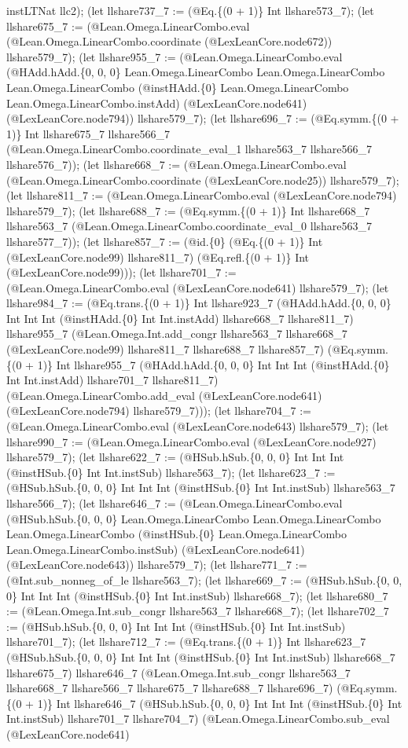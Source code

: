 \documentclass[11pt]{article}
\begin{document}
instLTNat llc2); (let llshare737\_7 := (@Eq.\{(0 + 1)\} Int llshare573\_7); (let llshare675\_7 := (@Lean.Omega.LinearCombo.eval (@Lean.Omega.LinearCombo.coordinate (@LexLeanCore.node672)) llshare579\_7); (let llshare955\_7 := (@Lean.Omega.LinearCombo.eval (@HAdd.hAdd.\{0, 0, 0\} Lean.Omega.LinearCombo Lean.Omega.LinearCombo Lean.Omega.LinearCombo (@instHAdd.\{0\} Lean.Omega.LinearCombo Lean.Omega.LinearCombo.instAdd) (@LexLeanCore.node641) (@LexLeanCore.node794)) llshare579\_7); (let llshare696\_7 := (@Eq.symm.\{(0 + 1)\} Int llshare675\_7 llshare566\_7 (@Lean.Omega.LinearCombo.coordinate\_eval\_1 llshare563\_7 llshare566\_7 llshare576\_7)); (let llshare668\_7 := (@Lean.Omega.LinearCombo.eval (@Lean.Omega.LinearCombo.coordinate (@LexLeanCore.node25)) llshare579\_7); (let llshare811\_7 := (@Lean.Omega.LinearCombo.eval (@LexLeanCore.node794) llshare579\_7); (let llshare688\_7 := (@Eq.symm.\{(0 + 1)\} Int llshare668\_7 llshare563\_7 (@Lean.Omega.LinearCombo.coordinate\_eval\_0 llshare563\_7 llshare577\_7)); (let llshare857\_7 := (@id.\{0\} (@Eq.\{(0 + 1)\} Int (@LexLeanCore.node99) llshare811\_7) (@Eq.refl.\{(0 + 1)\} Int (@LexLeanCore.node99))); (let llshare701\_7 := (@Lean.Omega.LinearCombo.eval (@LexLeanCore.node641) llshare579\_7); (let llshare984\_7 := (@Eq.trans.\{(0 + 1)\} Int llshare923\_7 (@HAdd.hAdd.\{0, 0, 0\} Int Int Int (@instHAdd.\{0\} Int Int.instAdd) llshare668\_7 llshare811\_7) llshare955\_7 (@Lean.Omega.Int.add\_congr llshare563\_7 llshare668\_7 (@LexLeanCore.node99) llshare811\_7 llshare688\_7 llshare857\_7) (@Eq.symm.\{(0 + 1)\} Int llshare955\_7 (@HAdd.hAdd.\{0, 0, 0\} Int Int Int (@instHAdd.\{0\} Int Int.instAdd) llshare701\_7 llshare811\_7) (@Lean.Omega.LinearCombo.add\_eval (@LexLeanCore.node641) (@LexLeanCore.node794) llshare579\_7))); (let llshare704\_7 := (@Lean.Omega.LinearCombo.eval (@LexLeanCore.node643) llshare579\_7); (let llshare990\_7 := (@Lean.Omega.LinearCombo.eval (@LexLeanCore.node927) llshare579\_7); (let llshare622\_7 := (@HSub.hSub.\{0, 0, 0\} Int Int Int (@instHSub.\{0\} Int Int.instSub) llshare563\_7); (let llshare623\_7 := (@HSub.hSub.\{0, 0, 0\} Int Int Int (@instHSub.\{0\} Int Int.instSub) llshare563\_7 llshare566\_7); (let llshare646\_7 := (@Lean.Omega.LinearCombo.eval (@HSub.hSub.\{0, 0, 0\} Lean.Omega.LinearCombo Lean.Omega.LinearCombo Lean.Omega.LinearCombo (@instHSub.\{0\} Lean.Omega.LinearCombo Lean.Omega.LinearCombo.instSub) (@LexLeanCore.node641) (@LexLeanCore.node643)) llshare579\_7); (let llshare771\_7 := (@Int.sub\_nonneg\_of\_le llshare563\_7); (let llshare669\_7 := (@HSub.hSub.\{0, 0, 0\} Int Int Int (@instHSub.\{0\} Int Int.instSub) llshare668\_7); (let llshare680\_7 := (@Lean.Omega.Int.sub\_congr llshare563\_7 llshare668\_7); (let llshare702\_7 := (@HSub.hSub.\{0, 0, 0\} Int Int Int (@instHSub.\{0\} Int Int.instSub) llshare701\_7); (let llshare712\_7 := (@Eq.trans.\{(0 + 1)\} Int llshare623\_7 (@HSub.hSub.\{0, 0, 0\} Int Int Int (@instHSub.\{0\} Int Int.instSub) llshare668\_7 llshare675\_7) llshare646\_7 (@Lean.Omega.Int.sub\_congr llshare563\_7 llshare668\_7 llshare566\_7 llshare675\_7 llshare688\_7 llshare696\_7) (@Eq.symm.\{(0 + 1)\} Int llshare646\_7 (@HSub.hSub.\{0, 0, 0\} Int Int Int (@instHSub.\{0\} Int Int.instSub) llshare701\_7 llshare704\_7) (@Lean.Omega.LinearCombo.sub\_eval (@LexLeanCore.node641) 
\end{document}
